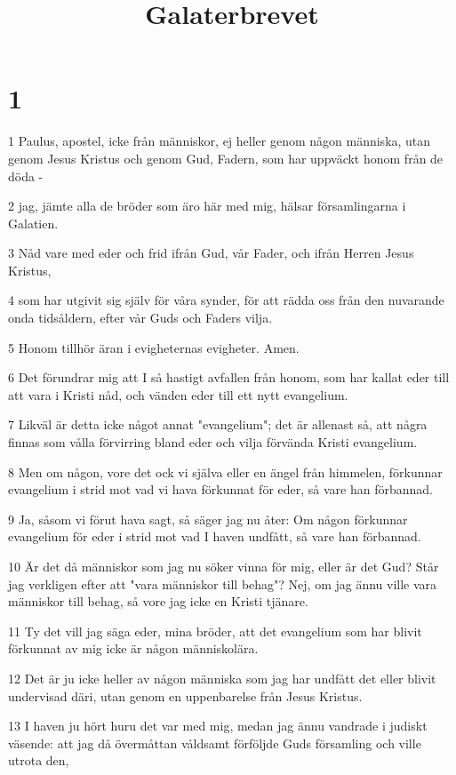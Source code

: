 

\title{Galaterbrevet}


\chapter{1}

\par 1 Paulus, apostel, icke från människor, ej heller genom någon människa, utan genom Jesus Kristus och genom Gud, Fadern, som har uppväckt honom från de döda -
\par 2 jag, jämte alla de bröder som äro här med mig, hälsar församlingarna i Galatien.
\par 3 Nåd vare med eder och frid ifrån Gud, vår Fader, och ifrån Herren Jesus Kristus,
\par 4 som har utgivit sig själv för våra synder, för att rädda oss från den nuvarande onda tidsåldern, efter vår Guds och Faders vilja.
\par 5 Honom tillhör äran i evigheternas evigheter. Amen.
\par 6 Det förundrar mig att I så hastigt avfallen från honom, som har kallat eder till att vara i Kristi nåd, och vänden eder till ett nytt evangelium.
\par 7 Likväl är detta icke något annat "evangelium"; det är allenast så, att några finnas som vålla förvirring bland eder och vilja förvända Kristi evangelium.
\par 8 Men om någon, vore det ock vi själva eller en ängel från himmelen, förkunnar evangelium i strid mot vad vi hava förkunnat för eder, så vare han förbannad.
\par 9 Ja, såsom vi förut hava sagt, så säger jag nu åter: Om någon förkunnar evangelium för eder i strid mot vad I haven undfått, så vare han förbannad.
\par 10 Är det då människor som jag nu söker vinna för mig, eller är det Gud? Står jag verkligen efter att "vara människor till behag"? Nej, om jag ännu ville vara människor till behag, så vore jag icke en Kristi tjänare.
\par 11 Ty det vill jag säga eder, mina bröder, att det evangelium som har blivit förkunnat av mig icke är någon människolära.
\par 12 Det är ju icke heller av någon människa som jag har undfått det eller blivit undervisad däri, utan genom en uppenbarelse från Jesus Kristus.
\par 13 I haven ju hört huru det var med mig, medan jag ännu vandrade i judiskt väsende: att jag då övermåttan våldsamt förföljde Guds församling och ville utrota den,
